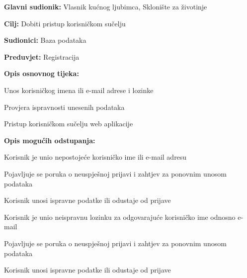 \noindent {}
\begin{packed_item}

	\item \textbf{Glavni sudionik: }Vlasnik kućnog ljubimca, Sklonište za životinje
	\item  \textbf{Cilj:} Dobiti pristup korisničkom sučelju
	\item  \textbf{Sudionici:} Baza podataka
	\item  \textbf{Preduvjet:} Registracija
	\item  \textbf{Opis osnovnog tijeka:}

	\item[] \begin{packed_enum}

		\item Unos korisničkog imena ili e-mail adrese i lozinke
		\item Provjera ispravnosti unesenih podataka
		\item Pristup korisničkom sučelju web aplikacije
	\end{packed_enum}

	\item  \textbf{Opis mogućih odstupanja:}

	\item[] \begin{packed_item}

		\item[2.a] Korisnik je unio nepostojeće korisničko ime ili e-mail adresu
		\item[] \begin{packed_enum}

			\item Pojavljuje se poruka o neuspješnoj prijavi i zahtjev za ponovnim unosom podataka
			\item Korisnik unosi ispravne podatke ili odustaje od prijave

		\end{packed_enum}
		\item[2.b] Korisnik je unio neispravnu lozinku za odgovarajuće korisničko ime odnosno e-mail
		\item[] \begin{packed_enum}

			\item Pojavljuje se poruka o neuspješnoj prijavi i zahtjev za ponovnim unosom podataka
			\item Korisnik unosi ispravne podatke ili odustaje od prijave

		\end{packed_enum}

	\end{packed_item}
\end{packed_item}

